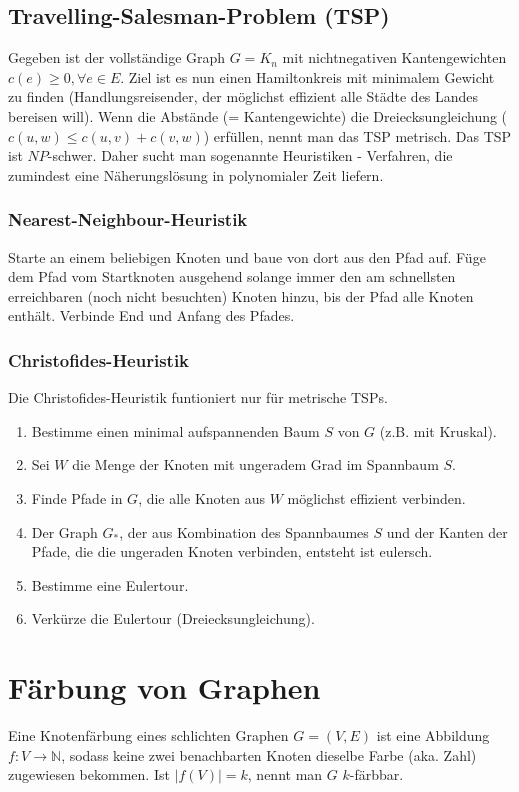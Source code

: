 \documentclass[10pt,a4paper,landscape]{article}
\begin{document}
\begin{multicols*}{2}
    \subsection{ Travelling-Salesman-Problem (TSP) }
    Gegeben ist der vollständige Graph $G = K_n$ mit nichtnegativen Kantengewichten $c(e) \geq 0, \forall e \in E$. Ziel ist es nun einen Hamiltonkreis mit 
    minimalem Gewicht zu finden (Handlungsreisender, der möglichst effizient alle Städte des Landes bereisen will). Wenn die Abstände (= Kantengewichte) die 
    Dreiecksungleichung ($c(u,w) \leq c(u,v) + c(v,w)$) erfüllen, nennt man das TSP metrisch. Das TSP ist $NP$-schwer. Daher sucht man 
    sogenannte Heuristiken - Verfahren, die zumindest eine Näherungslösung in polynomialer Zeit liefern.
    \subsubsection*{ Nearest-Neighbour-Heuristik }
    Starte an einem beliebigen Knoten und baue von dort aus den Pfad auf. Füge dem Pfad vom Startknoten ausgehend solange immer den am schnellsten erreichbaren 
    (noch nicht besuchten) Knoten hinzu, bis der Pfad alle Knoten enthält. Verbinde End und Anfang des Pfades.
    \subsubsection*{ Christofides-Heuristik }
    Die Christofides-Heuristik funtioniert nur für metrische TSPs.
    \begin{enumerate}
        \item Bestimme einen minimal aufspannenden Baum $S$ von $G$ (z.B. mit Kruskal).
        \item Sei $W$ die Menge der Knoten mit ungeradem Grad im Spannbaum $S$.
        \item Finde Pfade in $G$, die alle Knoten aus $W$ möglichst effizient verbinden.
        \item Der Graph $G_*$, der aus Kombination des Spannbaumes $S$ und der Kanten der Pfade, die die ungeraden Knoten verbinden, entsteht ist eulersch.
        \item Bestimme eine Eulertour.
        \item Verkürze die Eulertour (Dreiecksungleichung).
    \end{enumerate}


\section{ Färbung von Graphen }
    Eine Knotenfärbung eines schlichten Graphen $G = (V,E)$ ist eine Abbildung $f:V \rightarrow \mathbb{N}$, sodass keine zwei benachbarten Knoten dieselbe 
    Farbe (aka. Zahl) zugewiesen bekommen. Ist $|f(V)| = k$, nennt man $G$ $k$-färbbar. 


\end{multicols*}
\end{document}
